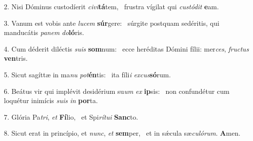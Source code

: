 2. Nisi Dóminus custodíerit \textit{ci}\textit{vi}\textbf{tá}tem, \ast\  frustra vígilat qui \textit{cus}\textit{tó}\textit{dit} \textbf{e}am.\

3. Vanum est vobis ante \textit{lu}\textit{cem} \textbf{súr}gere: \ast\  súrgite postquam sedéritis, qui manducátis \textit{pa}\textit{nem} \textit{do}\textbf{ló}ris.\

4. Cum déderit diléctis \textit{su}\textit{is} \textbf{som}num: \ast\  ecce heréditas Dómini fílii: mer\textit{ces}, \textit{fruc}\textit{tus} \textbf{ven}tris.\

5. Sicut sagíttæ in ma\textit{nu} \textit{pot}\textbf{én}tis: \ast\  ita fíli\textit{i} \textit{ex}\textit{cus}\textbf{só}rum.\

6. Beátus vir qui implévit desidérium su\textit{um} \textit{ex} \textbf{ip}sis: \ast\  non confundétur cum loquétur inimícis \textit{su}\textit{is} \textit{in} \textbf{por}ta.\

7. Glória Pa\textit{tri}, \textit{et} \textbf{Fí}lio, \ast\  et Spi\textit{rí}\textit{tu}\textit{i} \textbf{Sanc}to.\

8. Sicut erat in princípio, et \textit{nunc}, \textit{et} \textbf{sem}per, \ast\  et in sǽcula sæ\textit{cu}\textit{ló}\textit{rum}. \textbf{A}men.\

